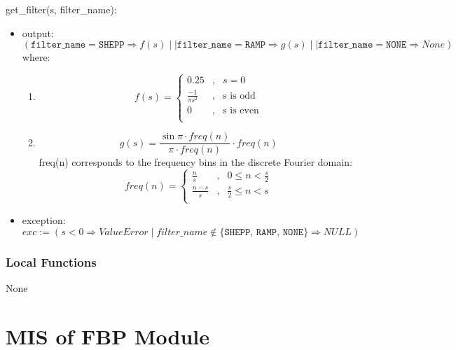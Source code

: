\documentclass[12pt, titlepage]{article}
\begin{document}
\noindent get\_filter(s, filter\_name):
\begin{itemize}
\item output: \((\texttt{filter\_name} = \texttt{SHEPP} \Rightarrow f(s) \mid\mid
  \texttt{filter\_name} = \texttt{RAMP} \Rightarrow g(s) \mid\mid \texttt{filter\_name} =
  \texttt{NONE} \Rightarrow None)\) where:\\
  \begin{enumerate}
    \item
      \begin{equation}
        f(s) =
        \left\{
          \begin{aligned}
            0.25 &, & s = 0 \\
            \frac{-1}{{\pi s}^2} &, & \text{s is odd}\\
            0 &, & \text{s is even}\\
          \end{aligned}
        \right.
      \end{equation}
    \item
      \begin{equation}
        g(s) =
        \frac{\sin{\pi\cdot freq(n)}}{\pi\cdot freq(n)} \cdot freq(n)
      \end{equation}
      freq(n) corresponds to the frequency bins in the discrete Fourier domain:\\
      \begin{equation}
        freq(n) =
        \left\{
          \begin{aligned}
            \frac{n}{s} &, & 0 \leq n < \frac{s}{2} \\
            \frac{n - s}{s} &, & \frac{s}{2} \leq n < s \\
          \end{aligned}
        \right.
      \end{equation}
    \end{enumerate}
  \item exception: \(exc := (s < 0 \Rightarrow ValueError \mid filter\_name \notin \{\texttt{SHEPP, RAMP, NONE}\} \Rightarrow NULL)\)
\end{itemize}


\subsubsection{Local Functions}
None

\newpage

\section{MIS of FBP Module} \label{ModuleFBP}
\end{document}
